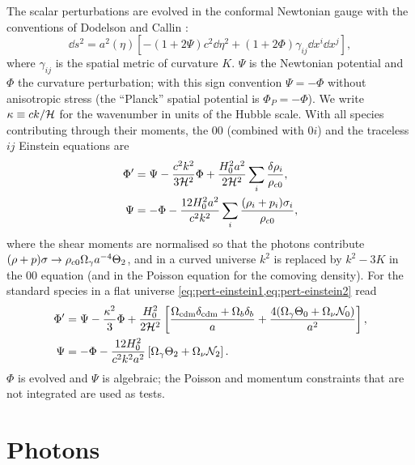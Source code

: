 The scalar perturbations are evolved in the conformal Newtonian gauge with the conventions of
Dodelson \cite{Dodelson2003} and Callin \cite{Callin2006}:
\begin{equation}
\dd s^2=a^2(\eta)\left[-(1+2\Psi)c^2\dd\eta^2+(1+2\Phi)\gamma_{ij}\dd x^i\dd x^j\right],
\end{equation}
where $\gamma_{ij}$ is the spatial metric of curvature $K$. $\Psi$ is the Newtonian potential and $\Phi$ the curvature
perturbation; with this sign convention $\Psi=-\Phi$ without anisotropic stress (the ``Planck'' spatial potential is
$\Phi_P=-\Phi$). We write $\kappa\equiv ck/\mathcal{H}$ for the wavenumber in units of the Hubble scale. With all species
contributing through their moments, the $00$ (combined with $0i$) and the traceless $ij$ Einstein equations are
\begin{align}
\Phi'&=\Psi-\frac{c^2k^2}{3\mathcal{H}^2}\Phi+\frac{H_0^2a^2}{2\mathcal{H}^2}\sum_i\frac{\delta\rho_i}{\rho_{c0}},
\label{eq:pert-einstein1}\\
\Psi&=-\Phi-\frac{12H_0^2a^2}{c^2k^2}\sum_i\frac{(\rho_i+p_i)\sigma_i}{\rho_{c0}},
\label{eq:pert-einstein2}
\end{align}
where the shear moments are normalised so that the photons contribute $(\rho+p)\sigma\to\rho_{c0}\Omega_\gamma a^{-4}
\Theta_2$, and in a curved universe $k^2$ is replaced by $k^2-3K$ in the $00$ equation (and in the Poisson equation for the
comoving density). For the standard species in a flat universe \cref{eq:pert-einstein1,eq:pert-einstein2} read
\begin{align}
\Phi'&=\Psi-\frac{\kappa^2}{3}\Phi+\frac{H_0^2}{2\mathcal{H}^2}\left[\frac{\Omega_{\rm cdm}\delta_{\rm cdm}+\Omega_b\delta_b}{a}
+\frac{4(\Omega_\gamma\Theta_0+\Omega_\nu\mathcal N_0)}{a^2}\right],\\
\Psi&=-\Phi-\frac{12H_0^2}{c^2k^2a^2}\left[\Omega_\gamma\Theta_2+\Omega_\nu\mathcal N_2\right].
\end{align}
$\Phi$ is evolved and $\Psi$ is algebraic; the Poisson and momentum constraints that are not integrated are used as
tests.

\section{Photons}

